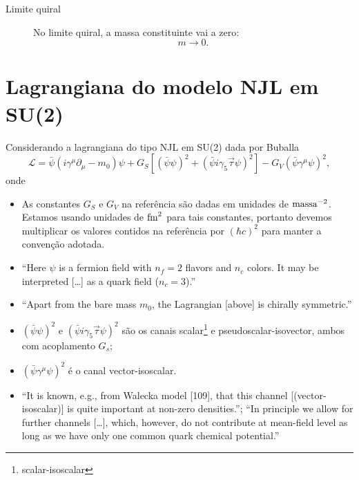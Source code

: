 \begin{description}
	\item[Limite quiral] No limite quiral, a massa constituinte vai a zero:
		\begin{equation}
			m \to 0.
		\end{equation}
\end{description}

\section{Lagrangiana do modelo NJL em SU(2)}

Considerando a lagrangiana do tipo NJL em SU(2) dada por Buballa\cite{Buballa1996}
\begin{equation}\label{Eq:LagNJL-SU2-Bub}
	\mathcal{L} = \bar{\psi}(i\gamma^\mu\partial_\mu - m_0)\psi + G_S[(\bar{\psi}\psi)^2 + (\bar{\psi}i\gamma_5\vec{\tau}\psi)^2] - G_V(\bar{\psi}\gamma^\mu \psi)^2,
\end{equation}
%
onde
\begin{itemize}
	\item As constantes $G_S$ e $G_V$ na referência são dadas em unidades de $\rm{massa}^{-2}$. Estamos usando unidades de $\rm{fm}^2$ para tais constantes, portanto devemos multiplicar os valores contidos na referência por $(\hbar c)^2$ para manter a convenção adotada.
	\item ``Here $\psi$ is a fermion field with $n_f = 2$ flavors and $n_c$ colors. It may be interpreted [\dots] as a quark field ($n_c = 3$).''
	\item ``Apart from the bare mass $m_0$, the Lagrangian [above] is chirally symmetric.''
	\item $(\bar{\psi}\psi)^2$ e $(\bar{\psi}i\gamma_5\vec{\tau}\psi)^2$ são os canais scalar\footnote{scalar-isoscalar} e pseudoscalar-isovector, ambos com acoplamento $G_s$;
	\item $(\bar{\psi}\gamma^\mu \psi)^2$ é o canal vector-isoscalar. 
	\item ``It is known, e.g., from Walecka model [109], that this channel [(vector-isoscalar)] is quite important at non-zero densities.''; ``In principle we allow for further channels [\dots], which, however, do not contribute at mean-field level as long as we have only one common quark chemical potential.''\cite{Buballa}
\end{itemize}

